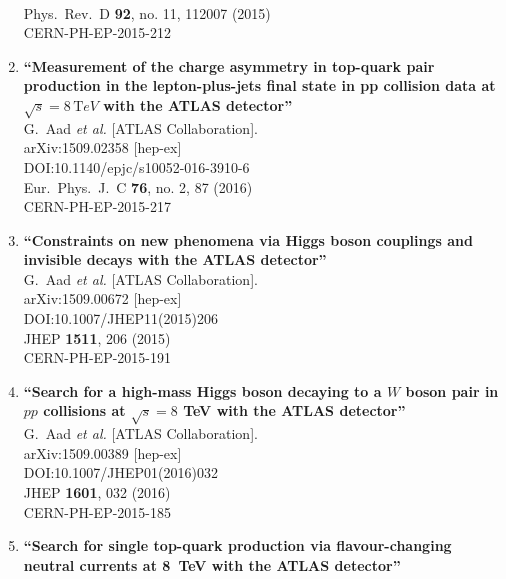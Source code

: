 \documentclass{article}
\begin{document}
\begin{enumerate}
  \\{}Phys.\ Rev.\ D {\bf 92}, no. 11, 112007 (2015)
  \\{}CERN-PH-EP-2015-212
\item%
{\bf ``Measurement of the charge asymmetry in top-quark pair production in the lepton-plus-jets final state in pp collision data at $\sqrt{s}=8\,\mathrm TeV{}$ with the ATLAS detector''}
  \\{}G.~Aad {\it et al.} [ATLAS Collaboration].
  \\{}arXiv:1509.02358 [hep-ex]
  \\{}DOI:10.1140/epjc/s10052-016-3910-6
  \\{}Eur.\ Phys.\ J.\ C {\bf 76}, no. 2, 87 (2016)
  \\{}CERN-PH-EP-2015-217
\item%
{\bf ``Constraints on new phenomena via Higgs boson couplings and invisible decays with the ATLAS detector''}
  \\{}G.~Aad {\it et al.} [ATLAS Collaboration].
  \\{}arXiv:1509.00672 [hep-ex]
  \\{}DOI:10.1007/JHEP11(2015)206
  \\{}JHEP {\bf 1511}, 206 (2015)
  \\{}CERN-PH-EP-2015-191
\item%
{\bf ``Search for a high-mass Higgs boson decaying to a $W$ boson pair in $pp$ collisions at $\sqrt{s} = 8$ TeV with the ATLAS detector''}
  \\{}G.~Aad {\it et al.} [ATLAS Collaboration].
  \\{}arXiv:1509.00389 [hep-ex]
  \\{}DOI:10.1007/JHEP01(2016)032
  \\{}JHEP {\bf 1601}, 032 (2016)
  \\{}CERN-PH-EP-2015-185
\item%
{\bf ``Search for single top-quark production via flavour-changing neutral currents at 8 TeV with the ATLAS detector''}

\end{enumerate}
\end{document}
